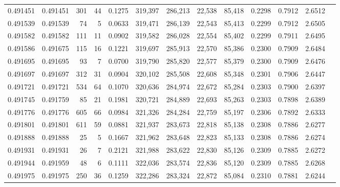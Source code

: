 \begin{tabular}{rrrrrrrrrrrrr}
0.491451 & 0.491451 &   301 &    44 &                                     0.1275 & 319,397 & 286,213 &  22,538 &  85,418 & 0.2298 & 0.7912 & 2.6512 \\
0.491539 & 0.491539 &    74 &     5 &                                     0.0633 & 319,471 & 286,139 &  22,543 &  85,413 & 0.2299 & 0.7912 & 2.6505 \\
0.491582 & 0.491582 &   111 &    11 &                                     0.0902 & 319,582 & 286,028 &  22,554 &  85,402 & 0.2299 & 0.7911 & 2.6495 \\
0.491586 & 0.491675 &   115 &    16 &                                     0.1221 & 319,697 & 285,913 &  22,570 &  85,386 & 0.2300 & 0.7909 & 2.6484 \\
0.491695 & 0.491695 &    93 &     7 &                                     0.0700 & 319,790 & 285,820 &  22,577 &  85,379 & 0.2300 & 0.7909 & 2.6476 \\
0.491697 & 0.491697 &   312 &    31 &                                     0.0904 & 320,102 & 285,508 &  22,608 &  85,348 & 0.2301 & 0.7906 & 2.6447 \\
0.491721 & 0.491721 &   534 &    64 &                                     0.1070 & 320,636 & 284,974 &  22,672 &  85,284 & 0.2303 & 0.7900 & 2.6397 \\
0.491745 & 0.491759 &    85 &    21 &                                     0.1981 & 320,721 & 284,889 &  22,693 &  85,263 & 0.2303 & 0.7898 & 2.6389 \\
0.491776 & 0.491776 &   605 &    66 &                                     0.0984 & 321,326 & 284,284 &  22,759 &  85,197 & 0.2306 & 0.7892 & 2.6333 \\
0.491801 & 0.491801 &   611 &    59 &                                     0.0881 & 321,937 & 283,673 &  22,818 &  85,138 & 0.2308 & 0.7886 & 2.6277 \\
0.491888 & 0.491888 &    25 &     5 &                                     0.1667 & 321,962 & 283,648 &  22,823 &  85,133 & 0.2308 & 0.7886 & 2.6274 \\
0.491931 & 0.491931 &    26 &     7 &                                     0.2121 & 321,988 & 283,622 &  22,830 &  85,126 & 0.2309 & 0.7885 & 2.6272 \\
0.491944 & 0.491959 &    48 &     6 &                                     0.1111 & 322,036 & 283,574 &  22,836 &  85,120 & 0.2309 & 0.7885 & 2.6268 \\
0.491975 & 0.491975 &   250 &    36 &                                     0.1259 & 322,286 & 283,324 &  22,872 &  85,084 & 0.2310 & 0.7881 & 2.6244 \\

\end{tabular}
